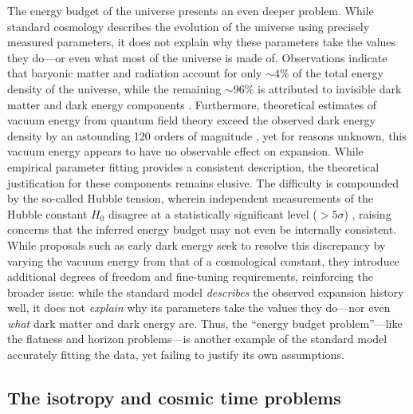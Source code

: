 \documentclass[aps,prd,reprint,superscriptaddress]{revtex4-2}
\begin{document}
The energy budget of the universe presents an even deeper problem. While standard cosmology describes the evolution of the universe using precisely measured parameters, it does not explain why these parameters take the values they do---or even what most of the universe is made of. Observations indicate that baryonic matter and radiation account for only $\sim4\%$ of the total energy density of the universe, while the remaining $\sim96\%$ is attributed to invisible dark matter and dark energy components \cite{Zwicky1933,Rubin1980,Riess1998,Perlmutter1999,Aghanim2020}. Furthermore, theoretical estimates of vacuum energy from quantum field theory exceed the observed dark energy density by an astounding 120 orders of magnitude \cite{Weinberg1989,Carroll1992}, yet for reasons unknown, this vacuum energy appears to have no observable effect on expansion. While empirical parameter fitting provides a consistent description, the theoretical justification for these components remains elusive. The difficulty is compounded by the so-called Hubble tension, wherein independent measurements of the Hubble constant $H_0$ disagree at a statistically significant level ($>5\sigma$) \cite{Freedman2017,Verde2019,Riess2024}, raising concerns that the inferred energy budget may not even be internally consistent. While proposals such as early dark energy \cite{Kamionkowski2023} seek to resolve this discrepancy by varying the vacuum energy from that of a cosmological constant, they introduce additional degrees of freedom and fine-tuning requirements, reinforcing the broader issue: while the standard model \textit{describes} the observed expansion history well, it does not \textit{explain} why its parameters take the values they do---nor even \textit{what} dark matter and dark energy are. Thus, the ``energy budget problem''---like the flatness and horizon problems---is another example of the standard model accurately fitting the data, yet failing to justify its own assumptions.

\subsection{The isotropy and cosmic time problems}
\end{document}
